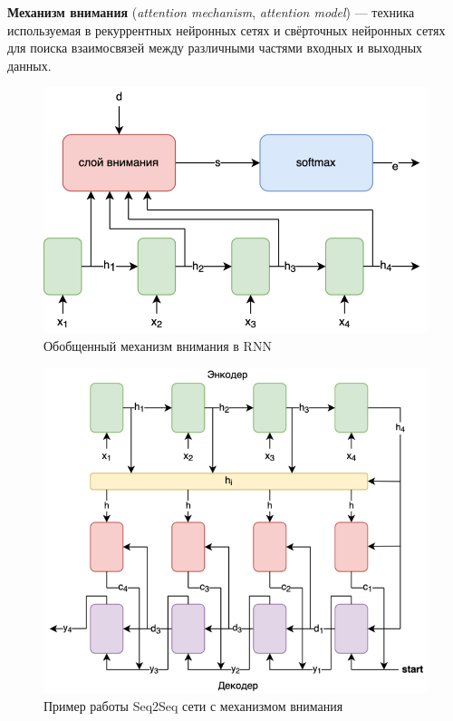 \begin{definition}
    \textbf{Механизм внимания} (\textit{attention mechanism}, \textit{attention model}) --- техника используемая в рекуррентных нейронных сетях и свёрточных нейронных сетях для поиска взаимосвязей между различными частями входных и выходных данных.
\end{definition}

\begin{figure}
    \centering
    \includegraphics[scale=2]{images/rnn-attention.png}
    \caption{Обобщенный механизм внимания в RNN}
\end{figure}

\begin{figure}
    \centering
    \includegraphics[scale=2.5]{images/seq2seq-attention.png}
    \caption{Пример работы Seq2Seq сети с механизмом внимания}
\end{figure}

